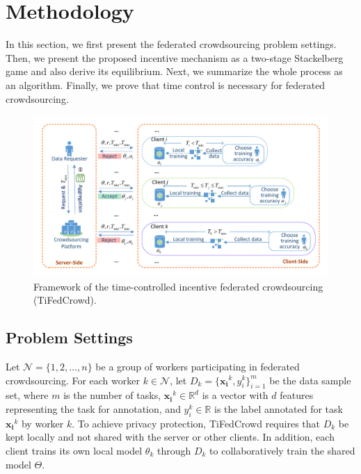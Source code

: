 \documentclass[final,1p,times]{elsarticle}
\begin{document}
\section{Methodology} \label{sec:mtd}
In this section, we first present the federated crowdsourcing problem settings. Then, we present the proposed incentive mechanism as a two-stage Stackelberg game and also derive its equilibrium. Next, we summarize the whole process as an algorithm. Finally, we prove that time control is necessary for federated crowdsourcing.

\begin{figure}
	\centering
	\includegraphics[width=5.5in]{TiFedCrowd framework.pdf}
	\caption{Framework of the time-controlled incentive federated crowdsourcing (TiFedCrowd).}
	\label{fig:framework}
\end{figure}

\subsection{Problem Settings}
Let $\bm{\mathcal{N}} = \{1,2,\dots,n\}$ be a group of workers participating in federated crowdsourcing. For each worker $k\in\bm{\mathcal{N}}$, let $D_k=\{\bm{x_i}^k,y_i^k\}_{i=1}^m$ be the data sample set, where $m$ is the number of tasks, $\bm{x_i}^k\in\mathbb{R}^d$ is a vector with $d$ features representing the task for annotation, and $y_i^k\in\mathbb{R}$ is the label annotated for task $\bm{x_i}^k$ by worker $k$. To achieve privacy protection, TiFedCrowd requires that $D_k$ be kept locally and not shared with the server or other clients. In addition, each client trains its own local model $\theta_k$ through $D_k$ to collaboratively train the shared model $\Theta$.
\end{document}
